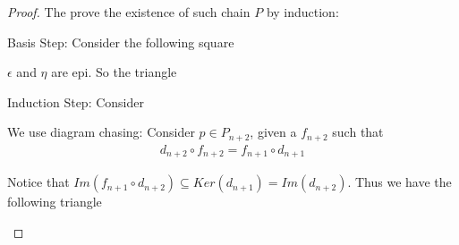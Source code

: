 \documentclass[Total.tex]{subfiles}
\begin{document}
				\begin{proof}
					The prove the existence of such chain $P$ by induction:
					
					Basis Step: Consider the following square
					\begin{center}
					\end{center}
					
					$\epsilon$ and $\eta$ are epi. So the triangle \begin{center}
					\end{center}
					
					Induction Step: Consider
					\begin{center}
					\end{center}
					
					We use diagram chasing: Consider $p\in P_{n+2}$, given a $f_{n+2}$ such that
					\begin{gather*}
						d_{n+2}\circ f_{n+2}=f_{n+1}\circ d_{n+1}
					\end{gather*}
					
					Notice that $Im(f_{n+1}\circ d_{n+2})\subseteq Ker(d_{n+1})=Im(d_{n+2})$. Thus we have the following triangle
					\begin{center}
					\end{center}
				\end{proof}
\end{document}
